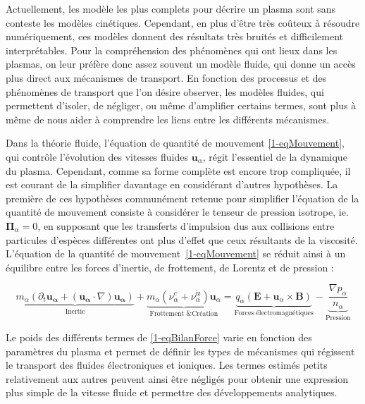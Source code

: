 \begin{refsection}
Actuellement, les modèle les plus complets pour décrire un plasma sont sans
conteste les modèles cinétiques. Cependant, en plus d'être très coûteux à
résoudre numériquement, ces modèles donnent des résultats très bruités
et difficilement interprétables. Pour la compréhension des phénomènes qui ont
lieux dans les plasmas, on leur préfère donc assez souvent un modèle fluide, qui
donne un accès plus direct aux mécanismes de transport. En fonction des
processus et des phénomènes de transport que l'on désire observer, les modèles
fluides, qui permettent d'isoler, de négliger, ou même d'amplifier certains
termes, sont plus à même de nous aider à comprendre les liens entre les différents mécanismes.

Dans la théorie fluide, l'équation de quantité de
mouvement \eqref{1-eqMouvement}, qui contrôle l'évolution des vitesses fluides
$\mathbf u_\alpha$, régit l'essentiel de la dynamique du plasma. Cependant, comme sa forme complète
 est encore trop compliquée, il est courant de la
simplifier davantage en considérant d'autres hypothèses.
La première de ces hypothèses communément retenue pour simplifier l'équation de
la quantité de mouvement consiste à considérer le tenseur de pression isotrope,
ie.
$\boldsymbol{\Pi}_\alpha=0$, en supposant que les transferts d'impulsion dus
aux collisions entre particules d'espèces différentes ont plus d'effet que
ceux résultants de la viscosité. L'équation de la quantité de
mouvement~\eqref{1-eqMouvement} se réduit ainsi à un équilibre entre les forces
d'inertie, de frottement, de Lorentz et de pression :

\begin{equation}
\label{1-eqBilanForce}
\underbrace{m_\alpha \left(\partial_t \mathbf{u_\alpha} +
(\mathbf{u_\alpha}\cdot\nabla)\mathbf{u_\alpha}\right)}_\text{Inertie}
+\underbrace{m_\alpha\left(\nu_\alpha^c+
\nu_\alpha^\text{iz}\right)\mathbf
u_\alpha}_\text{Frottement \& Création}=\underbrace{{q_\alpha}\left(\mathbf
E+\mathbf u_\alpha\times \mathbf B\right)}_\text{Forces électromagnétiques}
-\underbrace{\frac{\nabla p_\alpha}{n_\alpha}}_\text{Pression}
\end{equation}
 
Le poids des différents termes de \eqref{1-eqBilanForce} varie en fonction des
paramètres du plasma et permet de définir les types de mécanismes qui régissent
le transport des fluides électroniques et ioniques. Les termes estimés petits
relativement aux autres peuvent ainsi être négligés pour obtenir une
expression plus simple de la vitesse fluide et permettre des développements
analytiques.


\end{refsection}
